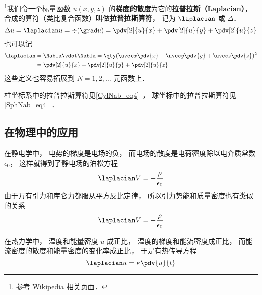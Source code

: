 
\begin{issues}
\issueDraft
\end{issues}


\footnote{参考 Wikipedia \href{https://en.wikipedia.org/wiki/Laplace_operator}{相关页面}．}我们令一个标量函数 $u(x, y, z)$ 的\textbf{梯度的散度}为它的\textbf{拉普拉斯（Laplacian）}， 合成的算符（类比复合函数）叫做\textbf{拉普拉斯算符}， 记为 $\laplacian$ 或 $\Delta$．
\begin{equation}
\Delta u = \laplacian u = \div (\grad u) = \pdv[2]{u}{x} + \pdv[2]{u}{y} + \pdv[2]{u}{z}
\end{equation}
也可以记
\begin{equation}
\begin{aligned}
\laplacian &= \Nabla \vdot \Nabla = \qty(\uvec x\pdv{x} + \uvec y\pdv{y} + \uvec z\pdv{z})^2\\
&= \pdv[2]{u}{x} + \pdv[2]{u}{y} + \pdv[2]{u}{z}
\end{aligned}
\end{equation}
这些定义也容易拓展到 $N = 1, 2, \dots$ 元函数上．

柱坐标系中的拉普拉斯算符见\autoref{CylNab_eq4}~， 球坐标中的拉普拉斯算符见\autoref{SphNab_eq4}~．

\subsection{在物理中的应用}
在静电学中， 电势的梯度是电场的负， 而电场的散度是电荷密度除以电介质常数 $\epsilon_0$， 这样就得到了静电场的泊松方程
\begin{equation}
\laplacian V = -\frac{\rho}{\epsilon_0}
\end{equation}
由于万有引力和库仑力都服从平方反比定律， 所以引力势能和质量密度也有类似的关系
\begin{equation}
\laplacian V = -\frac{\rho}{\epsilon_0}
\end{equation}

在热力学中， 温度和能量密度 $u$ 成正比， 温度的梯度和能流密度成正比， 而能流密度的散度和能量密度的变化率成正比， 于是有热传导方程
\begin{equation}
\laplacian u = \kappa \pdv{u}{t}
\end{equation}
